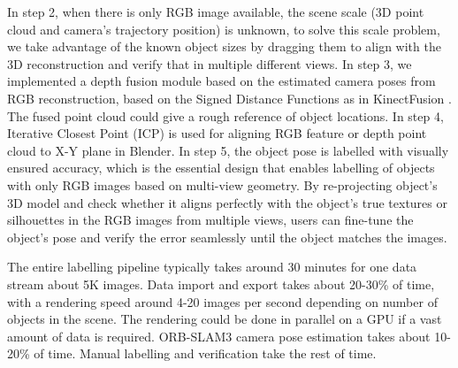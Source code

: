 \noindent
In step 2, when there is only RGB image available, the scene scale (3D point cloud and camera's trajectory position) is unknown, to solve this scale problem, we take advantage of the known object sizes by dragging them to align with the 3D reconstruction and verify that in multiple different views.
In step 3, we implemented a depth fusion module based on the estimated camera poses from RGB reconstruction, based on the Signed Distance Functions as in KinectFusion \cite{newcombe2011kinectfusion}. The fused point cloud could give a rough reference of object locations.
In step 4, Iterative Closest Point (ICP) is used for aligning RGB feature or depth point cloud to X-Y plane in Blender.
In step 5, the object pose is labelled with visually ensured accuracy, which is the essential design that enables labelling of objects with only RGB images based on multi-view geometry. By re-projecting object's 3D model and check whether it aligns perfectly with the object's true textures or silhouettes in the RGB images from multiple views, users can fine-tune the object's pose and verify the error seamlessly until the object matches the images. 

The entire labelling pipeline typically takes around 30 minutes for one data stream about 5K images. Data import and export takes about 20-30\% of time, with a rendering speed around 4-20 images per second depending on number of objects in the scene. The rendering could be done in parallel on a GPU if a vast amount of data is required. ORB-SLAM3 camera pose estimation takes about 10-20\% of time. Manual labelling and verification take the rest of time. 
